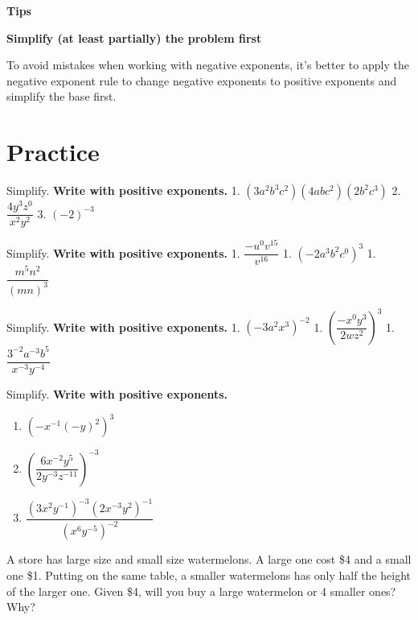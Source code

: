 \documentclass[en,12pt]{elegantbook}
\providecommand{\tightlist}{%
  \setlength{\itemsep}{0pt}\setlength{\parskip}{0pt}}
\newenvironment{rmdtip}{
	\par\noindent
	{
		\makebox[-\width][r]{
			\footnotesize\color{red!90}
            \HandRight
			\hspace*{1pt}
		}
			\textbf{
				\color{second}
				\hspace*{3pt}
				Tips 
			}
    }
    \begin{shaded}
    \sffamily
}{
    \par\medskip\ignorespacesafterend
    \end{shaded}
}
\providecommand{\tightlist}{%
  \setlength{\itemsep}{0pt}\setlength{\parskip}{0pt}}
\let\BeginKnitrBlock\begin \let\EndKnitrBlock\end
\begin{document}
\begin{rmdtip}

\textbf{Simplify (at least partially) the problem first}

To avoid mistakes when working with negative exponents, it's better to apply the negative exponent rule to change negative exponents to positive exponents and simplify the base first.

\end{rmdtip}

\hypertarget{practice}{%
\section{Practice}\label{practice}}

\BeginKnitrBlock{exercise}
\protect\hypertarget{exr:unnamed-chunk-3}{}{\label{exr:unnamed-chunk-3} }
Simplify. \textbf{Write with positive exponents.}
1. \((3a^2b^3c^2)(4abc^2)(2b^2c^3)\)
2. \(\dfrac{4y^3z^0}{x^2y^2}\)
3. \((-2)^{-3}\)
\EndKnitrBlock{exercise}

\BeginKnitrBlock{exercise}
\protect\hypertarget{exr:unnamed-chunk-4}{}{\label{exr:unnamed-chunk-4} }
Simplify. \textbf{Write with positive exponents.}
1. \(\dfrac{-u^0v^{15}}{v^{16}}\)
1. \((-2a^3b^2c^0)^3\)
1. \(\dfrac{m^5 n^{2}}{(mn)^3}\)
\EndKnitrBlock{exercise}

\BeginKnitrBlock{exercise}
\protect\hypertarget{exr:unnamed-chunk-5}{}{\label{exr:unnamed-chunk-5} }
Simplify. \textbf{Write with positive exponents.}
1. \((-3a^2x^3)^{-2}\)
1. \(\left(\dfrac{-x^0y^3}{2wz^2}\right)^3\)
1. \(\dfrac{3^{-2}a^{-3}b^5}{x^{-3}y^{-4}}\)
\EndKnitrBlock{exercise}

\BeginKnitrBlock{exercise}
\protect\hypertarget{exr:unnamed-chunk-6}{}{\label{exr:unnamed-chunk-6} }
Simplify. \textbf{Write with positive exponents.}

\begin{enumerate}
\def\labelenumi{\arabic{enumi}.}
\tightlist
\item
  \(\left(-x^{-1}(-y)^2\right)^3\)
\item
  \(\left(\dfrac{6x^{-2}y^5}{2y^{-3}z^{-11}}\right)^{-3}\)
\item
  \(\dfrac{(3 x^{2} y^{-1})^{-3}(2 x^{-3} y^{2})^{-1}}{(x^{6} y^{-5})^{-2}}\)
\end{enumerate}
\EndKnitrBlock{exercise}

\BeginKnitrBlock{exercise}
\protect\hypertarget{exr:unnamed-chunk-7}{}{\label{exr:unnamed-chunk-7} }
A store has large size and small size watermelons. A large one cost \$4 and a small one \$1. Putting on the same table, a smaller watermelons has only half the height of the larger one. Given \$4, will you buy a large watermelon or 4 smaller ones? Why?
\EndKnitrBlock{exercise}
\end{document}
